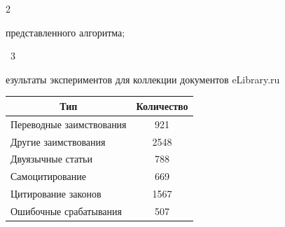 \begin{multicols}{2}
\begin{itemize}
представленного алгоритма;


\end{itemize}









\begin{center}


\noindent


\parbox{202pt}{{{\tablename~3}\ \ \small{


езультаты экспериментов для коллекции документов {\sf eLibrary.ru}


}}


}








\vspace*{6pt}





{\small 


\tabcolsep=10pt


\begin{tabular}{|l|c|}


  \hline


 \multicolumn{1}{|c|}{\bf Тип} & \bf Количество  \\


  \hline


Переводные заимствования & 921 \\ 




Другие заимствования & 2548\hphantom{9} \\ 




Двуязычные статьи & 788 \\ 




Самоцитирование & 669 \\ 




Цитирование законов & 1567\hphantom{9} \\ 




Ошибочные срабатывания & 507 \\ 





\end{tabular}}
\end{center}
\end{multicols}
